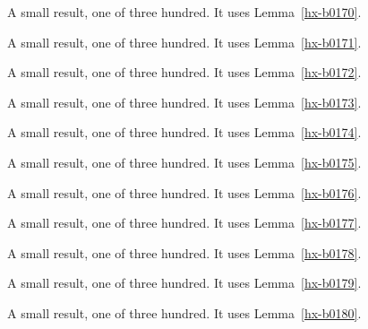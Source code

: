 \begin{lemma}[Bulk 171]\label{hx-b0171}
A small result, one of three hundred. It uses Lemma~\ref{hx-b0170}.
\end{lemma}

\begin{lemma}[Bulk 172]\label{hx-b0172}
A small result, one of three hundred. It uses Lemma~\ref{hx-b0171}.
\end{lemma}

\begin{lemma}[Bulk 173]\label{hx-b0173}
A small result, one of three hundred. It uses Lemma~\ref{hx-b0172}.
\end{lemma}

\begin{lemma}[Bulk 174]\label{hx-b0174}
A small result, one of three hundred. It uses Lemma~\ref{hx-b0173}.
\end{lemma}

\begin{lemma}[Bulk 175]\label{hx-b0175}
A small result, one of three hundred. It uses Lemma~\ref{hx-b0174}.
\end{lemma}

\begin{lemma}[Bulk 176]\label{hx-b0176}
A small result, one of three hundred. It uses Lemma~\ref{hx-b0175}.
\end{lemma}

\begin{lemma}[Bulk 177]\label{hx-b0177}
A small result, one of three hundred. It uses Lemma~\ref{hx-b0176}.
\end{lemma}

\begin{lemma}[Bulk 178]\label{hx-b0178}
A small result, one of three hundred. It uses Lemma~\ref{hx-b0177}.
\end{lemma}

\begin{lemma}[Bulk 179]\label{hx-b0179}
A small result, one of three hundred. It uses Lemma~\ref{hx-b0178}.
\end{lemma}

\begin{lemma}[Bulk 180]\label{hx-b0180}
A small result, one of three hundred. It uses Lemma~\ref{hx-b0179}.
\end{lemma}

\begin{lemma}[Bulk 181]\label{hx-b0181}
A small result, one of three hundred. It uses Lemma~\ref{hx-b0180}.
\end{lemma}

